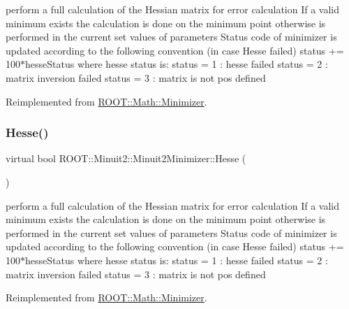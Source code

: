 perform a full calculation of the Hessian matrix for error calculation If a valid minimum exists the calculation is done on the minimum point otherwise is performed in the current set values of parameters Status code of minimizer is updated according to the following convention (in case Hesse failed) status += 100$\ast$hesse\+Status where hesse status is\+: status = 1 \+: hesse failed status = 2 \+: matrix inversion failed status = 3 \+: matrix is not pos defined 

Reimplemented from \mbox{\hyperlink{classROOT_1_1Math_1_1Minimizer_ae903e5936bef4ea7fac3301f9cdc50be}{R\+O\+O\+T\+::\+Math\+::\+Minimizer}}.

\mbox{\label{classROOT_1_1Minuit2_1_1Minuit2Minimizer_a0cfd04fde73c157de423705625ede51c}} 
\subsubsection{\texorpdfstring{Hesse()}{Hesse()}\hspace{0.1cm}{\footnotesize\ttfamily [2/3]}}
{\footnotesize\ttfamily virtual bool R\+O\+O\+T\+::\+Minuit2\+::\+Minuit2\+Minimizer\+::\+Hesse (\begin{DoxyParamCaption}{ }\end{DoxyParamCaption})\hspace{0.3cm}{\ttfamily [virtual]}}

perform a full calculation of the Hessian matrix for error calculation If a valid minimum exists the calculation is done on the minimum point otherwise is performed in the current set values of parameters Status code of minimizer is updated according to the following convention (in case Hesse failed) status += 100$\ast$hesse\+Status where hesse status is\+: status = 1 \+: hesse failed status = 2 \+: matrix inversion failed status = 3 \+: matrix is not pos defined 

Reimplemented from \mbox{\hyperlink{classROOT_1_1Math_1_1Minimizer_ae903e5936bef4ea7fac3301f9cdc50be}{R\+O\+O\+T\+::\+Math\+::\+Minimizer}}.

\mbox{\label{classROOT_1_1Minuit2_1_1Minuit2Minimizer_a0cfd04fde73c157de423705625ede51c}} 

